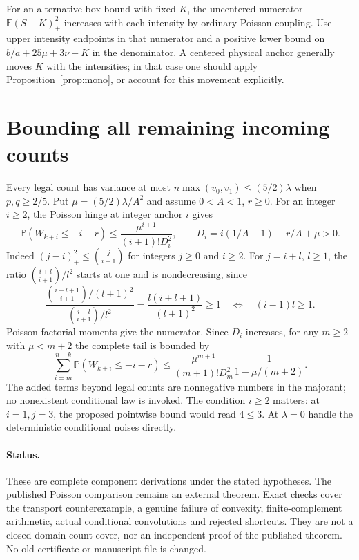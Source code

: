 \documentclass[11pt]{article}
\newcommand{\E}{\mathbb E}
\newcommand{\Pp}{\mathbb P}
\newcommand{\1}{\mathbf1}
\begin{document}
For an alternative box bound with fixed $K$, the uncentered numerator
$\E(S-K)_+^2$ increases with each intensity by ordinary Poisson coupling.
Use upper intensity endpoints in that numerator and a positive lower
bound on $b/a+25\mu+3\nu-K$ in the denominator. A centered physical
anchor generally moves $K$ with the intensities; in that case one should
apply Proposition~\ref{prop:mono}, or account for this movement explicitly.

\section{Bounding all remaining incoming counts}
Every legal count has variance at most
$n\max(v_0,v_1)\le(5/2)\lambda$ when $p,q\ge2/5$.
Put $\mu=(5/2)\lambda/A^2$ and assume $0<A<1$, $r\ge0$.
For an integer $i\ge2$, the Poisson hinge at integer anchor $i$ gives
\[
 \Pp(W_{k+i}\le-i-r)
 \le\frac{\mu^{i+1}}{(i+1)!D_i^2},\qquad
 D_i=i(1/A-1)+r/A+\mu>0.
\]
Indeed $(j-i)_+^2\le\binom j{i+1}$ for integers $j\ge0$ and $i\ge2$.
For $j=i+l$, $l\ge1$, the ratio
$\binom{i+l}{i+1}/l^2$ starts at one and is nondecreasing, since
\[
 \frac{\binom{i+l+1}{i+1}/(l+1)^2}
      {\binom{i+l}{i+1}/l^2}
 =\frac{l(i+l+1)}{(l+1)^2}\ge1
 \quad\Longleftrightarrow\quad (i-1)l\ge1.
\]
Poisson factorial moments give the numerator. Since $D_i$ increases,
for any $m\ge2$ with $\mu<m+2$ the complete tail is bounded by
\[
 \sum_{i=m}^{n-k}\Pp(W_{k+i}\le-i-r)
 \le\frac{\mu^{m+1}}{(m+1)!D_m^2}\frac1{1-\mu/(m+2)}.
\]
The added terms beyond legal counts are nonnegative numbers in the
majorant; no nonexistent conditional law is invoked. The condition
$i\ge2$ matters: at $i=1,j=3$, the proposed pointwise bound would read
$4\le3$. At $\lambda=0$ handle the deterministic conditional noises
directly.

\paragraph{Status.}
These are complete component derivations under the stated hypotheses.
The published Poisson comparison remains an external theorem. Exact checks
cover the transport counterexample, a genuine failure of convexity,
finite-complement arithmetic, actual conditional convolutions and rejected
shortcuts. They are not a closed-domain count cover, nor an independent
proof of the published theorem. No old certificate or manuscript file is
changed.
\end{document}
